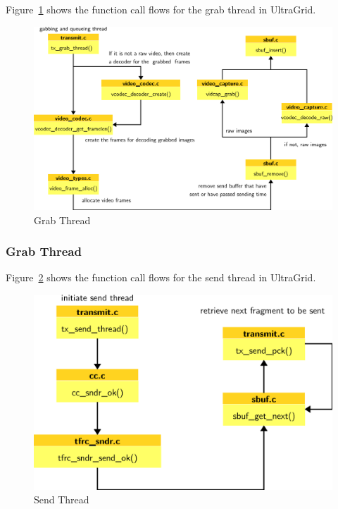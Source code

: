 Figure~\ref{fig:ultra-grab} shows the function call flows for the grab thread in
UltraGrid.

\begin{figure}[!h]
\begin{center}
\includegraphics[scale=.4]{./img/ultra-grab}
\caption{\label{fig:ultra-grab}Grab Thread}
\end{center}
\end{figure}

\subsubsection{\label{sssec:ultra-grab}Grab Thread} 

Figure~\ref{fig:ultra-send} shows the function call flows for the send thread in
UltraGrid.

\begin{figure}[!h]
\begin{center}
\includegraphics[scale=.4]{./img/ultra-send}
\caption{\label{fig:ultra-send}Send Thread}
\end{center}
\end{figure}

\newpage

